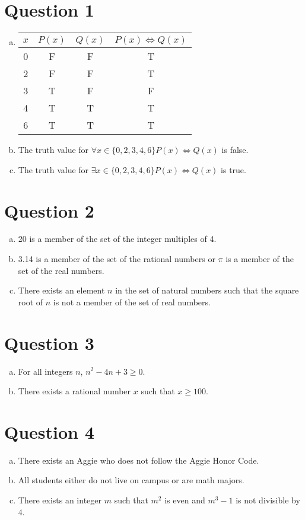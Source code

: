 \documentclass{article}
\begin{document}
\section*{Question 1}
\begin{enumerate}[(a)]
    \item
        \begin{tabular}{c|c|c|c}
            $x$ & $P(x)$ & $Q(x)$ & $P(x) \iff Q(x)$ \\
            \hline
            0 & F & F & T \\
            2 & F & F & T \\
            3 & T & F & F \\
            4 & T & T & T \\
            6 & T & T & T \\
        \end{tabular}
    \item The truth value for $\forall x \in \{0, 2, 3, 4, 6\} P(x) \iff Q(x)$ is false.
    \item The truth value for $\exists x \in \{0, 2, 3, 4, 6\} P(x) \iff Q(x)$ is true.
\end{enumerate}


\section*{Question 2}
\begin{enumerate}[(a)]
    \item 20 is a member of the set of the integer multiples of 4.
    \item 3.14 is a member of the set of the rational numbers or $\pi$ is a member of the set of the real numbers.
    \item There exists an element $n$ in the set of natural numbers such that the square root of $n$ is not a member of the set of real numbers.
\end{enumerate}

\section*{Question 3}
\begin{enumerate}[(a)]
    \item For all integers $n$, $n^2 -4n +3 \geq 0$.
    \item There exists a rational number $x$ such that $x \geq 100$.
\end{enumerate}

\section*{Question 4}
\begin{enumerate}[(a)]
    \item There exists an Aggie who does not follow the Aggie Honor Code.
    \item All students either do not live on campus or are math majors.
    \item There exists an integer $m$ such that $m^2$ is even and $m^3 - 1$ is not divisible by 4.
\end{enumerate}
\end{document}
